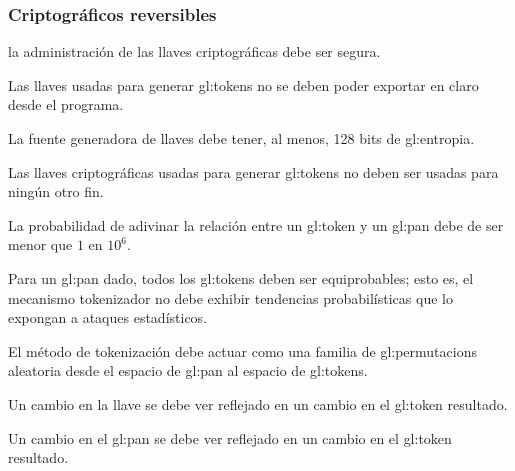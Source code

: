 %
%

\subsubsection{Criptográficos reversibles}

{
  la administración de las llaves criptográficas debe ser segura.

  {
    Las llaves usadas para generar \glspl{gl:token} no se deben poder
    exportar en claro desde el programa.
  }

  {
    La fuente generadora de llaves debe tener, al menos, 128 bits de
    \gls{gl:entropia}.
  }

  {
    Las llaves criptográficas usadas para generar \glspl{gl:token} no
    deben ser usadas para ningún otro fin.
  }
}

{
  La probabilidad de adivinar la relación entre un \gls{gl:token} y un
  \gls{gl:pan} debe de ser menor que $ 1 $ en $ 10^6 $.

  {
    Para un \gls{gl:pan} dado, todos los \glspl{gl:token} deben ser
    equiprobables; esto es, el mecanismo tokenizador no debe exhibir
    tendencias probabilísticas que lo expongan a ataques estadísticos.
  }

  {
    El método de tokenización debe actuar como una familia de
    \glspl{gl:permutacion} aleatoria desde el espacio de \gls{gl:pan} al
    espacio de \glspl{gl:token}.
  }

  {
    Un cambio en la llave se debe ver reflejado en un cambio en el
    \gls{gl:token} resultado.
  }

  {
    Un cambio en el \gls{gl:pan} se debe ver reflejado en un cambio en el
    \gls{gl:token} resultado.
  }

}

